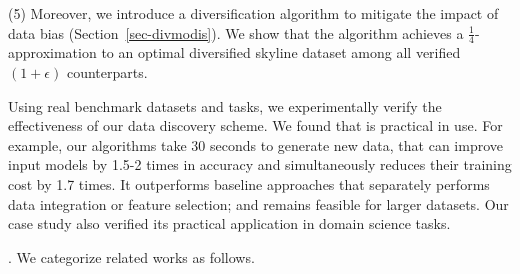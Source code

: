 
\sstab 
(5)
Moreover, we  
introduce a diversification 
algorithm to mitigate the  
impact of data bias (Section~\ref{sec-divmodis}).  
We show that the algorithm achieves a  
$\frac{1}{4}$-approximation to an optimal 
diversified skyline dataset among 
all verified $(1+\epsilon)$ counterparts. 



\vspace{.5ex}
Using real benchmark datasets and tasks, we experimentally 
verify the effectiveness of our data discovery 
scheme. We found that \modis is practical 
in use. For example, our algorithms take 
$30$ seconds to generate new data, 
that can improve input 
models by 1.5-2 times in accuracy 
and simultaneously reduces their training cost by 1.7 times. 
It outperforms baseline approaches  
that separately performs data integration  
or feature selection; 
and remains feasible for larger 
datasets. Our case study 
also verified its practical application 
in domain science tasks. 


. We categorize related works as follows. 

